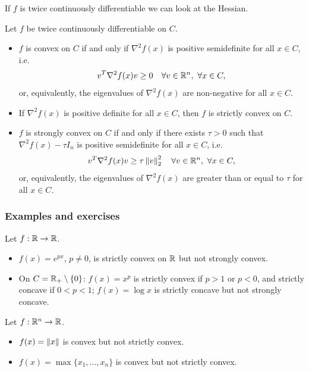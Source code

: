 If $f$ is twice continuously differentiable we can look at the Hessian.

\begin{theorem}
Let $f$ be twice continuously differentiable on $C$.
\begin{itemize}
    \item $f$ is convex on $C$ if and only if $\nabla^2 f(x)$ is positive semidefinite for all $x \in C$, i.e.
    \[
        v^T \nabla^2 f(x) v \ge 0 \quad \forall v \in \mathbb{R}^n,\ \forall x \in C,
    \]
    or, equivalently, the eigenvalues of $\nabla^2 f(x)$ are non-negative for all $x \in C$.
    \item If $\nabla^2 f(x)$ is positive definite for all $x \in C$, then $f$ is strictly convex on $C$.
    \item $f$ is strongly convex on $C$ if and only if there exists $\tau > 0$ such that $\nabla^2 f(x) - \tau I_n$ is positive semidefinite for all $x \in C$, i.e.
    \[
        v^T \nabla^2 f(x) v \ge \tau\left\lVert v \right\rVert_2^2 \quad \forall v \in \mathbb{R}^n,\ \forall x \in C,
    \]
    or, equivalently, the eigenvalues of $\nabla^2 f(x)$ are greater than or equal to $\tau$ for all $x \in C$.
\end{itemize}
\end{theorem}

\subsubsection{Examples and exercises}

\begin{example}
Let $f: \mathbb{R} \to \mathbb{R}$.
\begin{itemize}
    \item $f(x) = e^{px}$, $p \ne 0$, is strictly convex on $\mathbb{R}$ but not strongly convex.
    \item On $C = \mathbb{R}_+ \setminus \{0\}$: $f(x) = x^p$ is strictly convex if $p > 1$ or $p < 0$, and strictly concave if $0 < p < 1$; $f(x) = \log x$ is strictly concave but not strongly concave.
\end{itemize}
Let $f: \mathbb{R}^n \to \mathbb{R}$.
\begin{itemize}
    \item $f(x) = \left\lVert x \right\rVert$ is convex but not strictly convex.
    \item $f(x) = \max\{x_1, \dots, x_n\}$ is convex but not strictly convex.
\end{itemize}
\end{example}

